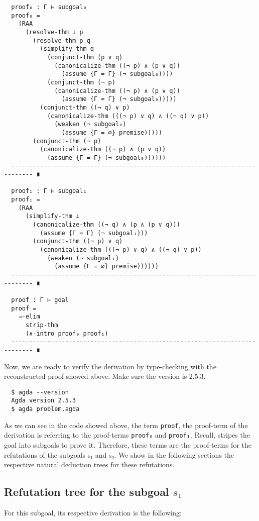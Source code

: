 \documentclass[../main.tex]{subfiles}
\begin{document}
\begin{subappendices}
\begin{verbatim}
  proof₀ : Γ ⊢ subgoal₀
  proof₀ =
    (RAA
      (resolve-thm ⊥ p
        (resolve-thm p q
          (simplify-thm q
            (conjunct-thm (p ∨ q)
              (canonicalize-thm ((¬ p) ∧ (p ∨ q))
                (assume {Γ = Γ} (¬ subgoal₀))))
            (conjunct-thm (¬ p)
              (canonicalize-thm ((¬ p) ∧ (p ∨ q))
                (assume {Γ = Γ} (¬ subgoal₀)))))
          (conjunct-thm ((¬ q) ∨ p)
            (canonicalize-thm (((¬ p) ∨ q) ∧ ((¬ q) ∨ p))
              (weaken (¬ subgoal₀)
                (assume {Γ = ∅} premise)))))
        (conjunct-thm (¬ p)
          (canonicalize-thm ((¬ p) ∧ (p ∨ q))
            (assume {Γ = Γ} (¬ subgoal₀))))))
  ---------------------------------------------------------------------------- ∎

  proof₁ : Γ ⊢ subgoal₁
  proof₁ =
    (RAA
      (simplify-thm ⊥
        (canonicalize-thm ((¬ q) ∧ (p ∧ (p ∨ q)))
          (assume {Γ = Γ} (¬ subgoal₁)))
        (conjunct-thm ((¬ p) ∨ q)
          (canonicalize-thm (((¬ p) ∨ q) ∧ ((¬ q) ∨ p))
            (weaken (¬ subgoal₁)
              (assume {Γ = ∅} premise))))))
  ---------------------------------------------------------------------------- ∎

  proof : Γ ⊢ goal
  proof =
    ⇒-elim
      strip-thm
      (∧-intro proof₀ proof₁)
  ---------------------------------------------------------------------------- ∎
\end{verbatim}

Now, we are ready to verify the \Metis derivation by type-checking with
\Agda the reconstructed proof showed above. Make sure the \Agda version is
 2.5.3.

\begin{verbatim}
  $ agda --version
  Agda version 2.5.3
  $ agda problem.agda
\end{verbatim}

As we can see in the \Agda code showed above, the term \verb!proof!, the proof-term
of the \Metis derivation is referring to the proof-terms \verb!proof₀! and \verb!proof₁!.
Recall, \Metis stripes the goal into subgoals to prove it. Therefore, these
terms are the proof-terms for the refutations of the subgoals s₁ and s₂.
We show in the following sections the respective natural deduction trees for these
refutations.

\subsection{Refutation tree for the subgoal $s₁$}
For this subgoal, its respective \TSTP derivation is
the following:


\end{subappendices}
\end{document}
